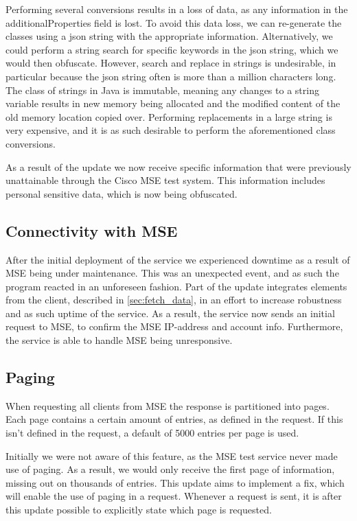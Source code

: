 Performing several conversions results in a loss of data, as any information in the additionalProperties field is lost. To avoid this data loss, we can re-generate the classes using a json string with the appropriate information. Alternatively, we could perform a string search for specific keywords in the json string, which we would then obfuscate. However, search and replace in strings is undesirable, in particular because the json string often is more than a million characters long. The class of strings in Java is immutable, meaning any changes to a string variable results in new memory being allocated and the modified content of the old memory location copied over. Performing replacements in a large string is very expensive, and it is as such desirable to perform the aforementioned class conversions. 

As a result of the update we now receive specific information that were previously unattainable through the Cisco MSE test system. This information includes personal sensitive data, which is now being obfuscated. 

\subsection{Connectivity with MSE}
After the initial deployment of the service we experienced downtime as a result of MSE being under maintenance. This was an unexpected event, and as such the program reacted in an unforeseen fashion. Part of the update integrates elements from the client, described in \ref{sec:fetch_data}, in an effort to increase robustness and as such uptime of the service. As a result, the service now sends an initial request to MSE, to confirm the MSE IP-address and account info. Furthermore, the service is able to handle MSE being unresponsive.

\subsection{Paging}
When requesting all clients from MSE the response is partitioned into pages. Each page contains a certain amount of entries, as defined in the request. If this isn't defined in the request, a default of 5000 entries per page is used. 

Initially we were not aware of this feature, as the MSE test service never made use of paging. As a result, we would only receive the first page of information, missing out on thousands of entries. This update aims to implement a fix, which will enable the use of paging in a request. Whenever a request is sent, it is after this update possible to explicitly state which page is requested.